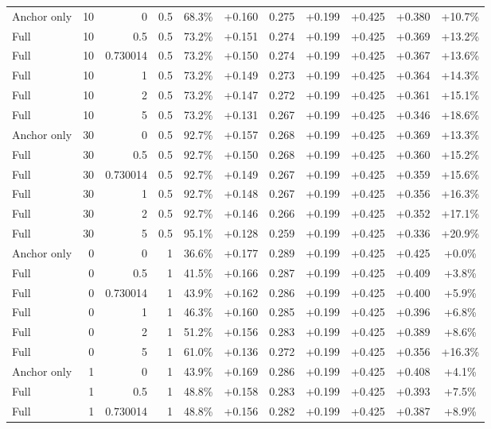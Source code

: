 \begin{table}[htbp]
\begin{tabular}{lrrrccccccc}
Anchor only & 10 & 0 & 0.5 & 68.3\% & +0.160 & 0.275 & +0.199 & +0.425 & +0.380 & +10.7\% \\
Full & 10 & 0.5 & 0.5 & 73.2\% & +0.151 & 0.274 & +0.199 & +0.425 & +0.369 & +13.2\% \\
Full & 10 & 0.730014 & 0.5 & 73.2\% & +0.150 & 0.274 & +0.199 & +0.425 & +0.367 & +13.6\% \\
Full & 10 & 1 & 0.5 & 73.2\% & +0.149 & 0.273 & +0.199 & +0.425 & +0.364 & +14.3\% \\
Full & 10 & 2 & 0.5 & 73.2\% & +0.147 & 0.272 & +0.199 & +0.425 & +0.361 & +15.1\% \\
Full & 10 & 5 & 0.5 & 73.2\% & +0.131 & 0.267 & +0.199 & +0.425 & +0.346 & +18.6\% \\
Anchor only & 30 & 0 & 0.5 & 92.7\% & +0.157 & 0.268 & +0.199 & +0.425 & +0.369 & +13.3\% \\
Full & 30 & 0.5 & 0.5 & 92.7\% & +0.150 & 0.268 & +0.199 & +0.425 & +0.360 & +15.2\% \\
Full & 30 & 0.730014 & 0.5 & 92.7\% & +0.149 & 0.267 & +0.199 & +0.425 & +0.359 & +15.6\% \\
Full & 30 & 1 & 0.5 & 92.7\% & +0.148 & 0.267 & +0.199 & +0.425 & +0.356 & +16.3\% \\
Full & 30 & 2 & 0.5 & 92.7\% & +0.146 & 0.266 & +0.199 & +0.425 & +0.352 & +17.1\% \\
Full & 30 & 5 & 0.5 & 95.1\% & +0.128 & 0.259 & +0.199 & +0.425 & +0.336 & +20.9\% \\
Anchor only & 0 & 0 & 1 & 36.6\% & +0.177 & 0.289 & +0.199 & +0.425 & +0.425 & +0.0\% \\
Full & 0 & 0.5 & 1 & 41.5\% & +0.166 & 0.287 & +0.199 & +0.425 & +0.409 & +3.8\% \\
Full & 0 & 0.730014 & 1 & 43.9\% & +0.162 & 0.286 & +0.199 & +0.425 & +0.400 & +5.9\% \\
Full & 0 & 1 & 1 & 46.3\% & +0.160 & 0.285 & +0.199 & +0.425 & +0.396 & +6.8\% \\
Full & 0 & 2 & 1 & 51.2\% & +0.156 & 0.283 & +0.199 & +0.425 & +0.389 & +8.6\% \\
Full & 0 & 5 & 1 & 61.0\% & +0.136 & 0.272 & +0.199 & +0.425 & +0.356 & +16.3\% \\
Anchor only & 1 & 0 & 1 & 43.9\% & +0.169 & 0.286 & +0.199 & +0.425 & +0.408 & +4.1\% \\
Full & 1 & 0.5 & 1 & 48.8\% & +0.158 & 0.283 & +0.199 & +0.425 & +0.393 & +7.5\% \\
Full & 1 & 0.730014 & 1 & 48.8\% & +0.156 & 0.282 & +0.199 & +0.425 & +0.387 & +8.9\% \\

\end{tabular}
\end{table}

